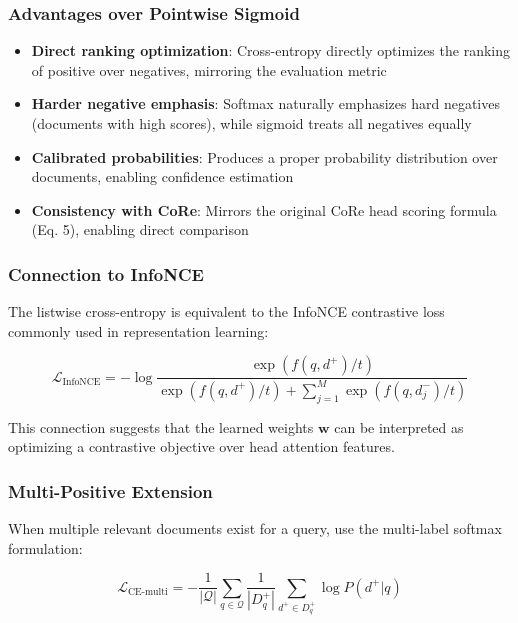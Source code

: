 \documentclass[11pt,a4paper]{article}
\begin{document}
\subsubsection{Advantages over Pointwise Sigmoid}

\begin{itemize}
    \item \textbf{Direct ranking optimization}: Cross-entropy directly optimizes the ranking of positive over negatives, mirroring the evaluation metric
    \item \textbf{Harder negative emphasis}: Softmax naturally emphasizes hard negatives (documents with high scores), while sigmoid treats all negatives equally
    \item \textbf{Calibrated probabilities}: Produces a proper probability distribution over documents, enabling confidence estimation
    \item \textbf{Consistency with CoRe}: Mirrors the original CoRe head scoring formula (Eq. 5), enabling direct comparison
\end{itemize}

\subsubsection{Connection to InfoNCE}

The listwise cross-entropy is equivalent to the InfoNCE contrastive loss commonly used in representation learning:

\begin{equation}
    \mathcal{L}_{\text{InfoNCE}} = -\log \frac{\exp(f(q, d^+) / t)}{\exp(f(q, d^+) / t) + \sum_{j=1}^{M} \exp(f(q, d^-_j) / t)}
\end{equation}

This connection suggests that the learned weights $\mathbf{w}$ can be interpreted as optimizing a contrastive objective over head attention features.

\subsubsection{Multi-Positive Extension}

When multiple relevant documents exist for a query, use the multi-label softmax formulation:

\begin{equation}
    \mathcal{L}_{\text{CE-multi}} = -\frac{1}{|\mathcal{Q}|} \sum_{q \in \mathcal{Q}} \frac{1}{|D^+_q|} \sum_{d^+ \in D^+_q} \log P(d^+ | q)
\end{equation}
\end{document}
